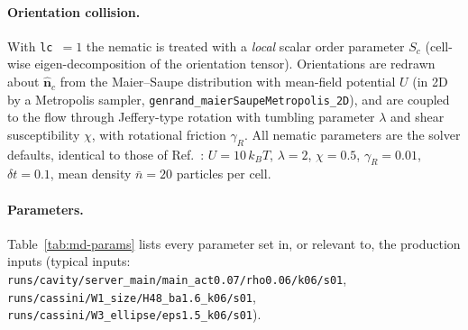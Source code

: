 \paragraph{Orientation collision.} With \texttt{lc}~$=1$ the nematic is treated with a
\emph{local} scalar order parameter $S_c$ (cell-wise eigen-decomposition of the orientation tensor).
Orientations are redrawn about $\hat{\mathbf n}_c$ from the Maier--Saupe distribution with
mean-field potential $U$ (in 2D by a Metropolis sampler, \texttt{genrand\_maierSaupeMetropolis\_2D}),
and are coupled to the flow through Jeffery-type rotation with tumbling parameter $\lambda$ and shear
susceptibility $\chi$, with rotational friction $\gamma_R$. All nematic parameters are the solver
defaults, identical to those of Ref.~\cite{TODO_Kozhukhov2024}: $U=10\,k_BT$, $\lambda=2$, $\chi=0.5$,
$\gamma_R=0.01$, $\delta t=0.1$, mean density $\bar n=20$ particles per cell.

\paragraph{Parameters.} Table~\ref{tab:md-params} lists every parameter set in, or relevant to, the
production inputs (typical inputs: \texttt{runs/cavity/server\_main/main\_act0.07/rho0.06/k06/s01},
\texttt{runs/cassini/W1\_size/H48\_ba1.6\_k06/s01}, \texttt{runs/cassini/W3\_ellipse/eps1.5\_k06/s01}).

